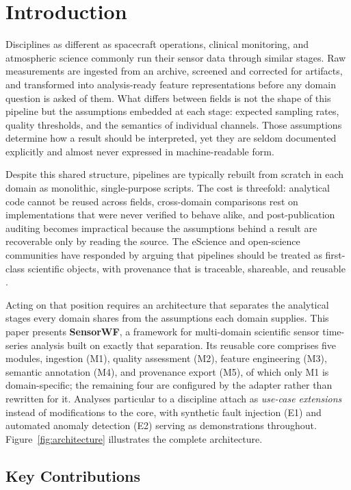 \documentclass[conference]{IEEEtran}
\begin{document}
\section{Introduction}

Disciplines as different as spacecraft operations, clinical monitoring, and atmospheric science commonly run their sensor data through similar stages. Raw measurements are ingested from an archive, screened and corrected for artifacts, and transformed into analysis-ready feature representations before any domain question is asked of them. What differs between fields is not the shape of this pipeline but the assumptions embedded at each stage: expected sampling rates, quality thresholds, and the semantics of individual channels. Those assumptions determine how a result should be interpreted, yet they are seldom documented explicitly and almost never expressed in machine-readable form.

Despite this shared structure, pipelines are typically rebuilt from scratch in each domain as monolithic, single-purpose scripts. The cost is threefold: analytical code cannot be reused across fields, cross-domain comparisons rest on implementations that were never verified to behave alike, and post-publication auditing becomes impractical because the assumptions behind a result are recoverable only by reading the source. The eScience and open-science communities have responded by arguing that pipelines should be treated as first-class scientific objects, with provenance that is traceable, shareable, and reusable \cite{wilkinson2016fair,garijo2022fair}.

Acting on that position requires an architecture that separates the analytical stages every domain shares from the assumptions each domain supplies. This paper presents \textbf{SensorWF}, a framework for multi-domain scientific sensor time-series analysis built on exactly that separation. Its reusable core comprises five modules, ingestion (M1), quality assessment (M2), feature engineering (M3), semantic annotation (M4), and provenance export (M5), of which only M1 is domain-specific; the remaining four are configured by the adapter rather than rewritten for it. Analyses particular to a discipline attach as \emph{use-case extensions} instead of modifications to the core, with synthetic fault injection (E1) and automated anomaly detection (E2) serving as demonstrations throughout. Figure~\ref{fig:architecture} illustrates the complete architecture.


\subsection{Key Contributions}
\end{document}
